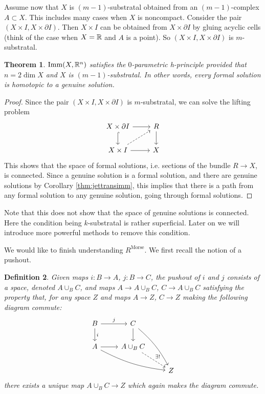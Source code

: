 \documentclass{article}
\newtheorem{theorem}{Theorem}[section]
\newtheorem{definition}[theorem]{Definition}
\newtheorem{proposed work}[theorem]{Proposed Work}
\DeclareMathOperator{\Imm}{Imm}
\DeclareMathOperator{\Morse}{Morse}
\begin{document}
Assume now that $X$ is $(m-1)$-substratal obtained from an $(m-1)$-complex $A \subset X$. This includes many cases when $X$ is noncompact. Consider the pair $(X\times I, X\times \partial I)$. Then $X\times I$ can be obtained from $X\times\partial I$ by gluing acyclic cells (think of the case when $X=\mathbb R$ and $A$ is a point). So $(X\times I, X\times \partial I)$ is $m$-substratal.

\begin{theorem}
$\Imm(X,\R^n)$ satisfies the $0$-parametric h-principle provided that $n=2\dim X$ and $X$ is $(m-1)$-substratal. In other words, every formal solution is homotopic to a genuine solution.
\end{theorem}

\begin{proof}
Since the pair $(X\times I, X\times \partial I)$ is $m$-substratal, we can solve the lifting problem
\begin{equation*}
\begin{tikzcd}
X\times\partial I \arrow[r] \arrow[hookrightarrow]{d}
& R \arrow[d]
\\
X \times I \arrow[r] \arrow[dashed,ur]
& X
\end{tikzcd}
\end{equation*}
This shows that the space of formal solutions, i.e. sections of the bundle $R \to X$, is connected.  Since a genuine solution is a formal solution, and there are genuine solutions by Corollary \ref{thm:jettransimm}, this implies that there is a path from any formal solution to any genuine solution, going through formal solutions.
\end{proof}
Note that this does not show that the space of genuine solutions is connected. Here the condition being $k$-substratal is rather superficial. Later on we will introduce more powerful methods to remove this condition.


We would like to finish understanding $R^{\Morse}$. We first recall the notion of a pushout.

\begin{definition}
Given maps $i: B \to A$, $j: B \to C$, the \emph{pushout} of $i$ and $j$ consists of a space, denoted $A \cup_B C$, and maps $A \to A\cup_B C$, $C \to A\cup_B C$ satisfying the property that, for any space $Z$ and maps $A \to Z$, $C \to Z$ making the following diagram commute:
\begin{equation*}
\begin{tikzcd}
B \arrow[r, "j"] \arrow[d,"i"] & C \arrow[d] \arrow[ddr, bend left=10] \\
A \arrow[r] \arrow[drr, bend right=10] & A \cup_B C \arrow[dashed, "\exists!", dr] \\
& & Z
\end{tikzcd}
\end{equation*}
there exists a unique map $A \cup_B C \to Z$ which again makes the diagram commute.
\end{definition}
\end{document}
